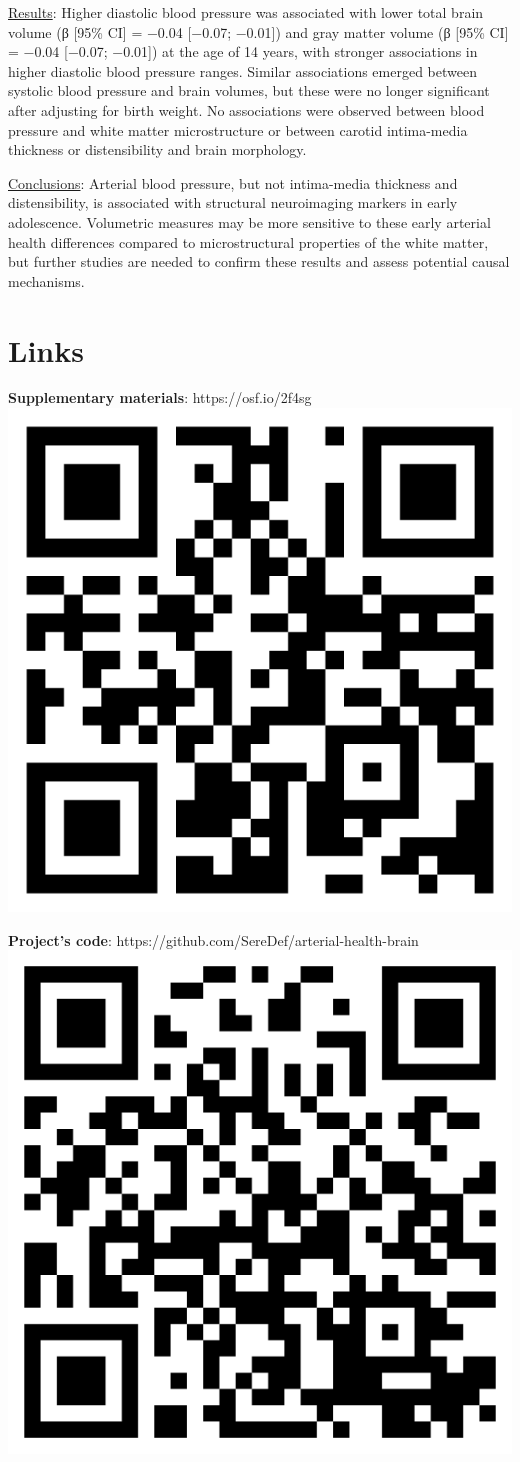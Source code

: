 \documentclass[
  letterpaper,
  DIV=11,
  numbers=noendperiod]{scrreport}
\begin{document}
\ul{Results}: Higher diastolic blood pressure was associated with lower
total brain volume (β {[}95\% CI{]} = −0.04 {[}−0.07; −0.01{]}) and gray
matter volume (β {[}95\% CI{]} = −0.04 {[}−0.07; −0.01{]}) at the age of
14 years, with stronger associations in higher diastolic blood pressure
ranges. Similar associations emerged between systolic blood pressure and
brain volumes, but these were no longer significant after adjusting for
birth weight. No associations were observed between blood pressure and
white matter microstructure or between carotid intima-media thickness or
distensibility and brain morphology.

\ul{Conclusions}: Arterial blood pressure, but not intima-media
thickness and distensibility, is associated with structural neuroimaging
markers in early adolescence. Volumetric measures may be more sensitive
to these early arterial health differences compared to microstructural
properties of the white matter, but further studies are needed to
confirm these results and assess potential causal mechanisms.

\newpage

\section*{Links}\label{links-3}


\textbf{Supplementary materials}: https://osf.io/2f4sg\newline
\includegraphics[width=0.2\linewidth,height=\textheight,keepaspectratio]{7.Chapter/../img/qrcode_supp7.png}

\textbf{Project's code}:
https://github.com/SereDef/arterial-health-brain\newline
\includegraphics[width=0.2\linewidth,height=\textheight,keepaspectratio]{7.Chapter/../img/qrcode_chap7_repo.png}
\end{document}
